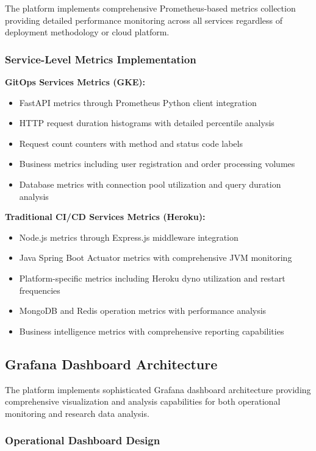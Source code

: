 The platform implements comprehensive Prometheus-based metrics collection providing detailed performance monitoring across all services regardless of deployment methodology or cloud platform.

\subsubsection{Service-Level Metrics Implementation}

\textbf{GitOps Services Metrics (GKE):}
\begin{itemize}
\item FastAPI metrics through Prometheus Python client integration
\item HTTP request duration histograms with detailed percentile analysis
\item Request count counters with method and status code labels
\item Business metrics including user registration and order processing volumes
\item Database metrics with connection pool utilization and query duration analysis
\end{itemize}

\textbf{Traditional CI/CD Services Metrics (Heroku):}
\begin{itemize}
\item Node.js metrics through Express.js middleware integration
\item Java Spring Boot Actuator metrics with comprehensive JVM monitoring
\item Platform-specific metrics including Heroku dyno utilization and restart frequencies
\item MongoDB and Redis operation metrics with performance analysis
\item Business intelligence metrics with comprehensive reporting capabilities
\end{itemize}

\subsection{Grafana Dashboard Architecture}

The platform implements sophisticated Grafana dashboard architecture providing comprehensive visualization and analysis capabilities for both operational monitoring and research data analysis.

\subsubsection{Operational Dashboard Design}

